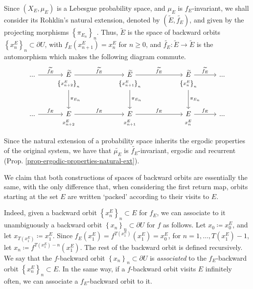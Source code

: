 \documentclass[11pt]{article}
\theoremstyle{definition}
\theoremstyle{remark}
\theoremstyle{plain}
\begin{document}
Since $ (X_E, \mu_E) $ is a Lebesgue probability space, and $ \mu_E $ is $ f_E$-invariant, we shall consider its Rohklin's natural extension, denoted by $ (\widetilde{E},  \widetilde{f_E}) $, and given by the projecting morphisms $ \left\lbrace \pi_{E_{n}}\right\rbrace _n $. Thus, $ \widetilde{E} $ is the space of backward orbits $ \left\lbrace x^E_n\right\rbrace _n\subset \partial U $, with $ f_{E}(x^E_{n+1})=x^E_n $ for $ n\geq 0 $, and $ \widetilde{f_{E}}\colon  \widetilde{E}\to \widetilde{E}$ is the automorphism which makes  the following diagram commute.
\[\begin{tikzcd}[row sep=-0.2em,/tikz/row 3/.style={row sep=4em}]
	...\arrow{r}{\widetilde{f_{E}}} &	\widetilde{E} \arrow{rr}{\widetilde{f_{E}}} & &	\widetilde{E} \arrow{rr}{\widetilde{f_{E}}} & &	\widetilde{E}\arrow{r}{\widetilde{f_{E}}} &...\\ 
	&	{\scriptstyle \left\lbrace x^E_{n+2}\right\rbrace _n} \arrow{ddddddd}{\pi_{E_{n}}}& &{\scriptstyle \left\lbrace x^E_{n+1}\right\rbrace _n} \arrow{ddddddd}{\pi_{E_{n}}}& &	{\scriptstyle \left\lbrace x^E_{n}\right\rbrace _n }\arrow{ddddddd}{\pi_{E_{n}}} \\ \\ \\	\\ \\ \\ \\...\arrow{r}{f_{E}} & E \arrow{rr}{f_{E}}  &&
 E \arrow{rr}{f_{E}}  && E \arrow{r}{f_{E}} &...\\ &{\scriptstyle x^E_{n+2} }&&{\scriptstyle x^E_{n+1} }&&{\scriptstyle x^E_n}
\end{tikzcd}
\]

Since the natural extension of a probability space inherits the ergodic properties of the original  system, we have that $ \widetilde{\mu_E} $ is  $ \widetilde{f_{E} }$-invariant, ergodic and recurrent (Prop. \ref{prop-ergodic-properties-natural-ext}). 

We claim that both constructions of spaces of backward orbits are essentially the same, with the only difference that, when considering the first return map, orbits starting at the set $ E $ are written `packed' according to their visits to $ E $.

Indeed, given a backward orbit $ \left\lbrace x^E_n\right\rbrace _n \subset E$ for $ f_{E} $, we can associate to it unambiguously a backward orbit $ \left\lbrace x_n\right\rbrace _n \subset \partial U$ for $ f$ as follows. Let $ x_0\coloneqq x^E_0 $, and let $ x_{T(x^E_1)}\coloneqq x^E_1 $. Since $ f_{E}(x^E_1)= f^{T(x^E_1)}(x^E_1)= x^E_0 $, for $ n=1,\dots, T(x^E_1)-1 $, let $ x_n \coloneqq f^{T(x^E_1)-n}(x^E_1)$. 
The rest of the backward orbit is defined recursively. We say that the $ f $-backward orbit $ \left\lbrace x_n\right\rbrace _n \subset \partial U$ is  \textit{associated} to the $ f_{E} $-backward orbit $ \left\lbrace x^E_n\right\rbrace _n \subset E$.   In the same way, if a $ f $-backward orbit visits $ E $ infinitely often, we can associate a $ f_E $-backward orbit to it.
\end{document}

